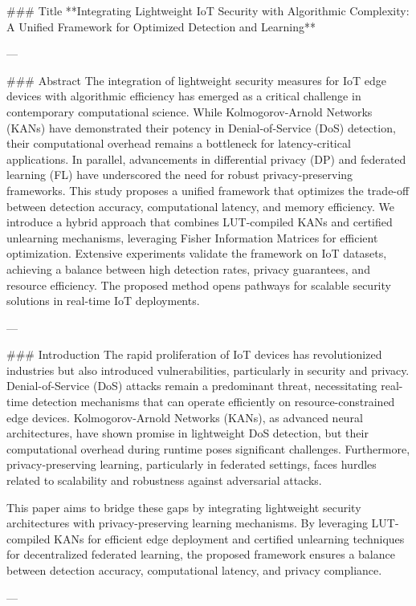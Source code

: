 ### Title  
**Integrating Lightweight IoT Security with Algorithmic Complexity: A Unified Framework for Optimized Detection and Learning**

---

### Abstract  
The integration of lightweight security measures for IoT edge devices with algorithmic efficiency has emerged as a critical challenge in contemporary computational science. While Kolmogorov-Arnold Networks (KANs) have demonstrated their potency in Denial-of-Service (DoS) detection, their computational overhead remains a bottleneck for latency-critical applications. In parallel, advancements in differential privacy (DP) and federated learning (FL) have underscored the need for robust privacy-preserving frameworks. This study proposes a unified framework that optimizes the trade-off between detection accuracy, computational latency, and memory efficiency. We introduce a hybrid approach that combines LUT-compiled KANs and certified unlearning mechanisms, leveraging Fisher Information Matrices for efficient optimization. Extensive experiments validate the framework on IoT datasets, achieving a balance between high detection rates, privacy guarantees, and resource efficiency. The proposed method opens pathways for scalable security solutions in real-time IoT deployments.

---

### Introduction  
The rapid proliferation of IoT devices has revolutionized industries but also introduced vulnerabilities, particularly in security and privacy. Denial-of-Service (DoS) attacks remain a predominant threat, necessitating real-time detection mechanisms that can operate efficiently on resource-constrained edge devices. Kolmogorov-Arnold Networks (KANs), as advanced neural architectures, have shown promise in lightweight DoS detection, but their computational overhead during runtime poses significant challenges. Furthermore, privacy-preserving learning, particularly in federated settings, faces hurdles related to scalability and robustness against adversarial attacks.

This paper aims to bridge these gaps by integrating lightweight security architectures with privacy-preserving learning mechanisms. By leveraging LUT-compiled KANs for efficient edge deployment and certified unlearning techniques for decentralized federated learning, the proposed framework ensures a balance between detection accuracy, computational latency, and privacy compliance.

---

